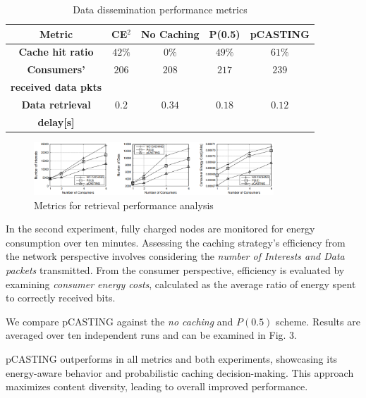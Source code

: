 \documentclass[conference]{IEEEtran}
\begin{document}
\begin{table}[htbp]
    \caption{Data dissemination performance metrics}
    \begin{center}
    \begin{tabular}{c|c|c|c|c|}
    \textbf{Metric} & \textbf{CE$^\text{2}$}& \textbf{No Caching} & \textbf{P(0.5)} & \textbf{pCASTING} \\
    \hline
    \textbf{Cache hit ratio} & $42 \%$ & $0 \%$ & $49 \%$ & $61 \%$ \\
    \hline
    \textbf{Consumers'} & $206$ & $208$ & $217$ & $239$ \\
    \textbf{received data pkts} & & & & \\
    \hline
    \textbf{Data retrieval} & $0.2$ & $0.34$ & $0.18$ & $0.12$ \\
    \textbf{delay[s]} & & & & \\
    \hline
    \end{tabular}
    \label{tab2}
    \end{center}
\end{table}

\begin{figure}[htbp]
    \centerline{\includegraphics[width=9cm]{fig3.png}}
    \caption{Metrics for retrieval performance analysis}
    \label{fig3}
\end{figure}

In the second experiment, fully charged nodes are monitored for energy consumption over ten minutes. Assessing the caching 
strategy's efficiency from the network perspective involves considering the \textit{number of Interests and Data packets} transmitted. 
From the consumer perspective, efficiency is evaluated by examining \textit{consumer energy costs}, calculated as the average ratio of 
energy spent to correctly received bits.

We compare pCASTING against the \textit{no caching} and $P(0.5)$ scheme. Results are averaged over ten independent runs
and can be examined in Fig. 3.

pCASTING outperforms in all metrics and both experiments, showcasing its energy-aware behavior and probabilistic 
caching decision-making. This approach maximizes content diversity, leading to overall improved performance.
\end{document}
